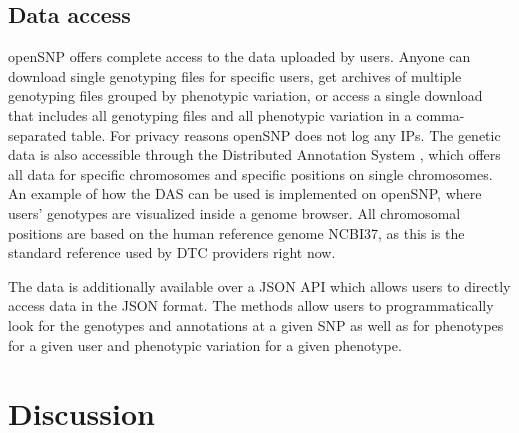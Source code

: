 \documentclass[10pt]{article}
\begin{document}
\subsection*{Data access}
openSNP offers complete access to the data uploaded by users. Anyone can download single genotyping files for specific users, get archives of multiple genotyping files 
grouped by phenotypic variation, or access a single download that includes all genotyping files and all phenotypic variation in a comma-separated table. For privacy reasons openSNP does not log any IPs. The genetic data is also 
accessible through the Distributed Annotation System \cite{Dowell2001,Jenkinson2008}, which offers all data for specific chromosomes and specific positions on single chromosomes. 
An example of how the DAS can be used is implemented on openSNP, where users' genotypes are visualized inside a genome browser. All chromosomal positions are based on the human reference genome NCBI37, as this is the standard reference used by DTC providers right now.

The data is additionally available over a JSON API which allows users to directly access data in the JSON format. The methods allow users to programmatically look for the genotypes and annotations at a given SNP as well as for phenotypes for a given user and phenotypic variation for a given phenotype.

\section*{Discussion}

%
%
\end{document}
